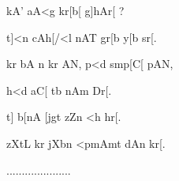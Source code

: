 \centerline{\odslXII kA' aA<g kr[b[ g]hAr[ ? }

\centerline{\odslXII t]<\odmbha{ }n cAh[/<l nAT gr[b y[b sr[. }

\centerline{\odslXII kr bA n kr \odtra AN,  p<d smp[\odreph C[ p\odsecra AN,}

\centerline{\odslXII h\odsignri <d aC[ tb nAm Dr[.}

\centerline{\odslXII t]\odmbha{} b[nA \odtra [jgt zZn\odsecya{} <h hr[.}

\centerline{\odslXII zXtL kr jXbn <p\odsecra mAm\odsignri t dAn kr[.}

.....................

\bye

